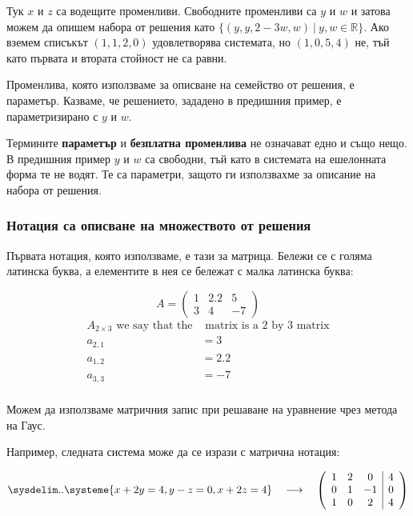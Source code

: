 \documentclass{subfiles}
\begin{document}
\noindent Тук $x$ и $z$ са водещите променливи. Свободните променливи са $y$ и $w$ и затова можем да опишем набора от решения като $\{ (y, y, 2 - 3w, w)\ |\ y, w \in \mathbb{R} \}$. Ако вземем списъкът $(1, 1, 2, 0)$ удовлетворява системата, но $(1, 0, 5, 4)$ не, тъй като първата и втората стойност не са равни.

\noindent Променлива, която използваме за описване на семейство от решения, е параметър. Казваме, че решението, зададено в предишния пример, е параметризирано с $y$ и $w$.

\noindent Термините \textbf{параметър} и \textbf{безплатна променлива} не означават едно и също нещо. В предишния пример $y$ и $w$ са свободни, тъй като в системата на ешелонната форма те не водят. Те са параметри, защото ги използвахме за описание на набора от решения.

\subsubsection{Нотация са описване на множеството от решения}

Първата нотация, която използваме, е тази за матрица. Бележи се с голяма латинска буква, а елементите в нея се бележат с малка латинска буква:

\begin{equation*}
    A = \left(
            \begin{array}{ ccc }
                1 & 2.2 & 5 \\
                3 & 4 & -7
            \end{array}
        \right)
\end{equation*}
\begin{align*}
    A_{2 \times 3} \text{ we say that the} & \text{ matrix is a 2 by 3 matrix} \\
    a_{2,1} &= 3 \\
    a_{1,2} &= 2.2 \\
    a_{3,3} &= -7 \\
\end{align*}

\noindent Можем да използваме матричния запис при решаване на уравнение чрез метода на Гаус.

\noindent Например, следната система може да се изрази с матрична нотация:

\begin{equation*}
    \sysdelim..\systeme{
        x + 2y = 4,
        y - z = 0,
        x + 2z = 4
    }
    \quad
    \longrightarrow
    \quad
    \left(
        \begin{array}{ ccc|c }
            1 & 2 & 0 & 4 \\
            0 & 1 & -1 & 0 \\
            1 & 0 & 2 & 4 \\
        \end{array}
    \right)
\end{equation*}
\end{document}
